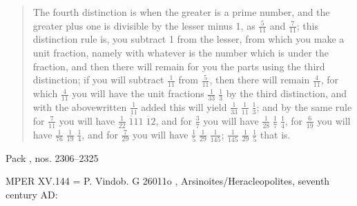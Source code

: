 \documentclass{article}
\theoremstyle{definition}
\begin{document}
\begin{quote}
The fourth distinction is when the greater is a prime number, and the greater plus one is divisible by the lesser minus 1, as
$\frac{5}{11}$ and $\frac{7}{11}$; this distinction rule is, you subtract 1 from the lesser, from which you make a unit fraction, namely with whatever is the number which is under the
fraction, and then there will
remain for you the parts using the third distinction; if you will subtract
$\frac{1}{11}$ from $\frac{5}{11}$, then there will remain $\frac{4}{11}$,
for which $\frac{4}{11}$ you will have the unit fractions $\frac{1}{33} \; \frac{1}{3}$
by the third distinction, and with the abovewritten $\frac{1}{11}$ added this will yield
$\frac{1}{33} \; \frac{1}{11} \; \frac{1}{3}$; and by the same rule for $\frac{7}{11}$ you will have
$\frac{1}{22} \; \overline{1}{11} \; \overline{1}{2}$, and for $\frac{3}{7}$ you will have 
$\frac{1}{28} \; \frac{1}{7} \; \frac{1}{4}$, for $\frac{6}{19}$ you will have $\frac{1}{76} \; \frac{1}{19} \; \frac{1}{4}$,
and for $\frac{7}{29}$ you will have $\frac{1}{5} \; \frac{1}{29} \; \frac{1}{145}$;
$\frac{1}{145} \; \frac{1}{29} \; \frac{1}{5}$ that is.
\end{quote}








Pack \cite{pack}, nos. 2306--2325










MPER XV.144 = P. Vindob. G 26011o \cite[p.~134]{MPERXV}, Arsinoites/Heracleopolites, seventh century AD:
\end{document}
